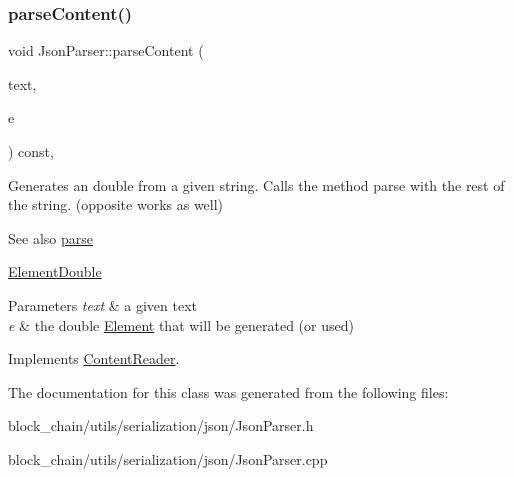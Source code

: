 \subsubsection{\texorpdfstring{parse\+Content()}{parseContent()}\hspace{0.1cm}{\footnotesize\ttfamily [6/6]}}
{\footnotesize\ttfamily void Json\+Parser\+::parse\+Content (\begin{DoxyParamCaption}\item[{std\+::string \&}]{text,  }\item[{\mbox{\hyperlink{classElementDouble}{Element\+Double}} $\ast$}]{e }\end{DoxyParamCaption}) const\hspace{0.3cm}{\ttfamily [override]}, {\ttfamily [virtual]}}

Generates an double from a given string. Calls the method parse with the rest of the string. (opposite works as well) \begin{DoxySeeAlso}{See also}
\mbox{\hyperlink{classJsonParser_a3ec3a9fcc8a63f987b4749d60b0568df}{parse}} 

\mbox{\hyperlink{classElementDouble}{Element\+Double}}
\end{DoxySeeAlso}

\begin{DoxyParams}{Parameters}
{\em text} & a given text \\
\hline
{\em e} & the double \mbox{\hyperlink{classElement}{Element}} that will be generated (or used) \\
\hline
\end{DoxyParams}


Implements \mbox{\hyperlink{classContentReader_ab4ba739ee5241848ae8af86e64e43a40}{Content\+Reader}}.



The documentation for this class was generated from the following files\+:\begin{DoxyCompactItemize}
\item 
block\+\_\+chain/utils/serialization/json/Json\+Parser.\+h\item 
block\+\_\+chain/utils/serialization/json/Json\+Parser.\+cpp\end{DoxyCompactItemize}
